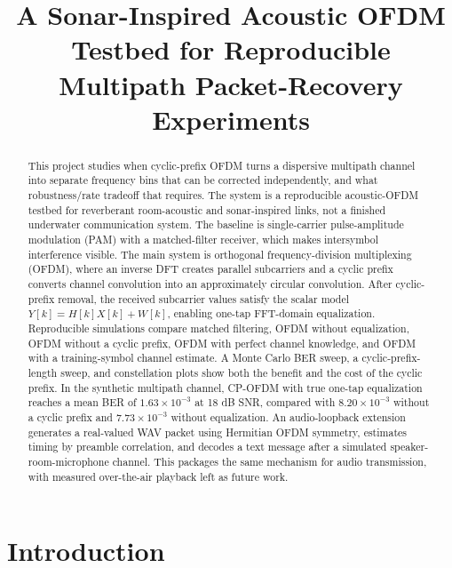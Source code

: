 \documentclass[conference]{IEEEtran}
\begin{document}
\title{A Sonar-Inspired Acoustic OFDM Testbed for Reproducible Multipath Packet-Recovery Experiments}

\author{
}

\maketitle

\begin{abstract}
This project studies when cyclic-prefix OFDM turns a dispersive multipath channel into separate frequency bins that can be corrected independently, and what robustness/rate tradeoff that requires. The system is a reproducible acoustic-OFDM testbed for reverberant room-acoustic and sonar-inspired links, not a finished underwater communication system. The baseline is single-carrier pulse-amplitude modulation (PAM) with a matched-filter receiver, which makes intersymbol interference visible.  The main system is orthogonal frequency-division multiplexing (OFDM), where an inverse DFT creates parallel subcarriers and a cyclic prefix converts channel convolution into an approximately circular convolution.  After cyclic-prefix removal, the received subcarrier values satisfy the scalar model $Y[k]=H[k]X[k]+W[k]$, enabling one-tap FFT-domain equalization.  Reproducible simulations compare matched filtering, OFDM without equalization, OFDM without a cyclic prefix, OFDM with perfect channel knowledge, and OFDM with a training-symbol channel estimate.  A Monte Carlo BER sweep, a cyclic-prefix-length sweep, and constellation plots show both the benefit and the cost of the cyclic prefix.  In the synthetic multipath channel, CP-OFDM with true one-tap equalization reaches a mean BER of $1.63\times 10^{-3}$ at 18 dB SNR, compared with $8.20\times 10^{-3}$ without a cyclic prefix and $7.73\times 10^{-3}$ without equalization. An audio-loopback extension generates a real-valued WAV packet using Hermitian OFDM symmetry, estimates timing by preamble correlation, and decodes a text message after a simulated speaker-room-microphone channel. This packages the same mechanism for audio transmission, with measured over-the-air playback left as future work. 
\end{abstract}

\section{Introduction}
\end{document}
